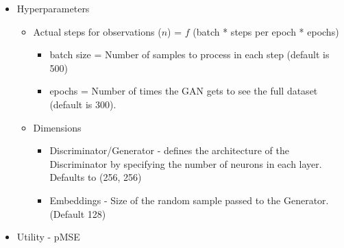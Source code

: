 \documentclass[t,8pt,utfx8]{beamer}
\begin{document}
\begin{spacing}{1.25}
\begin{frame}[c,plain]
\begin{itemize}
    \item Hyperparameters
    \begin{itemize}
        \item Actual steps for observations ($n$) = $f$ (batch * steps per epoch * epochs) 
        \begin{itemize}
            \item batch size = Number of samples to process in each step (default is 500)
            \item epochs = Number of times the GAN gets to see the full dataset (default is 300).
        \end{itemize}
        \item Dimensions
        \begin{itemize}
            \item Discriminator/Generator - defines the architecture of the Discriminator by specifying the number of neurons in each layer. Defaults to (256, 256)
            \item Embeddings - Size of the random sample passed to the Generator. (Default 128)
        \end{itemize}
    \end{itemize}
    \item Utility - pMSE
\end{itemize}

\end{frame}




\end{spacing}
\end{document}
